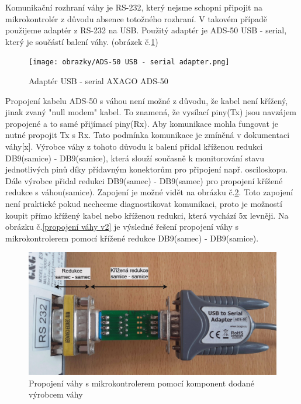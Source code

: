 Komunikační rozhraní váhy je RS-232, který nejsme schopni připojit na mikrokontrolér z důvodu absence totožného rozhraní. V takovém případě použijeme adaptér z RS-232 na USB. Použitý adaptér je ADS-50 USB - serial, který je součástí balení váhy. (obrázek č.\ref{adapter})

\begin{figure}[H]
    \begin{center}
        \texttt{[image: obrazky/ADS-50 USB - serial adapter.png]}
    \end{center}
    \caption{Adaptér USB - serial AXAGO ADS-50}
    \label{adapter}
\end{figure}

Propojení kabelu ADS-50 s váhou není možné z důvodu, že kabel není křížený, jinak zvaný "null modem" kabel. To znamená, že vysílací piny(Tx) jsou navzájem propojené a to samé přijímací piny(Rx). Aby komunikace mohla fungovat je nutné propojit Tx s Rx. Tato podmínka komunikace je zmíněná v dokumentaci váhy[x]. Výrobce váhy z tohoto důvodu k balení přidal kříženou redukci DB9(samice) - DB9(samice), která slouží současně k monitorování stavu jednotlivých pinů díky přídavným konektorům pro připojení např. osciloskopu. Dále výrobce přidal redukci DB9(samec) - DB9(samec) pro propojení křížené redukce s váhou(samice). Zapojení je možné vidět na obrázku č.\ref{propojení váhy v1}. Toto zapojení není praktické pokud nechceme diagnostikovat komunikaci, proto je možností koupit přímo křížený kabel nebo kříženou redukci, která vychází 5x levněji. Na obrázku č.\ref{propojení váhy v2} je výsledné řešení propojení váhy s mikrokontrolerem pomocí křížené redukce DB9(samec) - DB9(samice).

\begin{figure}[H]
    \begin{center}
        \includegraphics[scale=0.27]{obrazky/zapojeni_vahy_v1 - popis.png}
    \end{center}
    \caption{Propojení váhy s mikrokontrolerem pomocí komponent dodané výrobcem váhy}
    \label{propojení váhy v1}
\end{figure}

